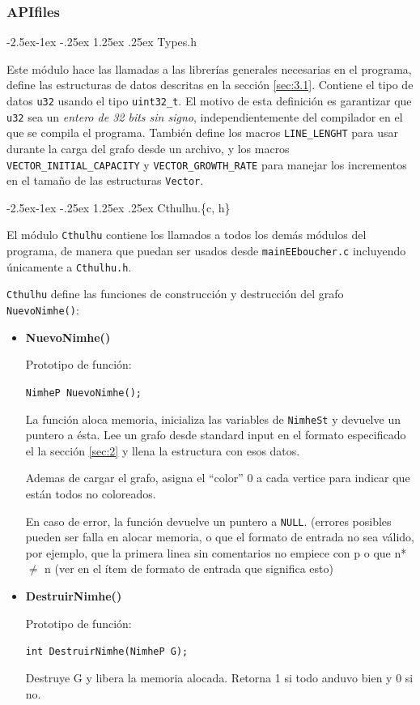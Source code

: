\documentclass[11pt,a4paper]{article}
\makeatletter
\renewcommand\paragraph{\@startsection{paragraph}{4}{\z@}%
            {-2.5ex\@plus -1ex \@minus -.25ex}%
            {1.25ex \@plus .25ex}%
            {\normalfont\normalsize\bfseries}}
\theoremstyle{plain}
\makeatother
\begin{document}
			\subsubsection{APIfiles}

				\paragraph{Types.h}

Este módulo hace las llamadas a las librerías generales necesarias en el programa, define las estructuras de datos descritas en la sección \ref{sec:3.1}. Contiene el tipo de datos \texttt{u32} usando el tipo \texttt{uint32\_t}. El motivo de esta definición es garantizar que \texttt{u32} sea un \emph{entero de 32 bits sin signo}, independientemente del compilador en el que se compila el programa. También define los macros \texttt{LINE\_LENGHT} para usar durante la carga del grafo desde un archivo, y los macros \texttt{VECTOR\_INITIAL\_CAPACITY} y \texttt{VECTOR\_GROWTH\_RATE} para manejar los incrementos en el tamaño de las estructuras \texttt{Vector}.

				\paragraph{Cthulhu.\{c, h\}}

El módulo \texttt{Cthulhu} contiene los llamados a todos los demás módulos del programa, de manera que puedan ser usados desde \texttt{mainEEboucher.c} incluyendo únicamente a \texttt{Cthulhu.h}.

\texttt{Cthulhu} define las funciones de construcción y destrucción del grafo \texttt{NuevoNimhe()}:

\begin{itemize}
\item{\textbf{{NuevoNimhe()}}}

Prototipo de función:

\texttt{NimheP NuevoNimhe();}

La función aloca memoria, inicializa las variables de \texttt{NimheSt} y devuelve un puntero a ésta. Lee un grafo desde standard input en el formato especificado el la sección \ref{sec:2} y llena la estructura con esos datos.

Ademas de cargar el grafo, asigna el “color” 0 a cada vertice para indicar que están todos no coloreados.

En caso de error, la función devuelve un puntero a \texttt{NULL}. (errores posibles pueden ser falla en alocar memoria, o que el formato de entrada no sea válido, por ejemplo, que la primera linea sin comentarios no empiece con p o que n* $\neq$ n (ver en el ítem de formato de entrada que significa esto)

\item{\textbf{{DestruirNimhe()}}}

Prototipo de función:

\texttt{int DestruirNimhe(NimheP G);}

Destruye G y libera la memoria alocada. Retorna 1 si todo anduvo bien y 0 si no.

\end{itemize}
\end{document}
